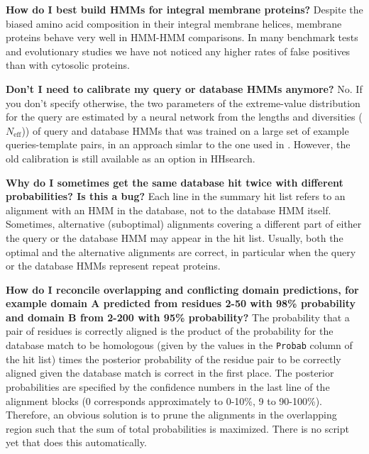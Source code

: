 \documentclass[11pt,a4paper]{article}
\begin{document}
{\bf How do I best build HMMs for integral membrane proteins?}
Despite the biased amino acid composition in their integral membrane helices, membrane proteins behave very well in HMM-HMM comparisons. In many benchmark tests and evolutionary studies we have not noticed any higher rates of false positives than with cytosolic proteins. 

{\bf Don't I need to calibrate my query or database HMMs anymore?}
No. If you don't specify otherwise, the two parameters of the extreme-value distribution for the query are estimated by a neural network from the lengths and diversities ($N_\mathrm{eff}$)) of query and database HMMs that was trained on a large set of example queries-template pairs, in an approach simlar to the one used in \cite{Sadreyev:2008}. However, the old calibration is still available as an option in HHsearch.

{\bf Why do I sometimes get the same database hit twice with different probabilities? Is this a bug?} Each line in the summary hit list refers to an alignment with an HMM in the database, not to the database HMM itself. Sometimes, alternative (suboptimal) alignments covering a different part of either the query or the database HMM may appear in the hit list. Usually, both the optimal and the alternative alignments are correct, in particular when the query or the database HMMs represent repeat proteins. 

{\bf How do I reconcile overlapping and conflicting domain predictions, for example domain A predicted from residues 2-50 with 98\% probability and domain B from 2-200 with 95\% probability?} The probability that a pair of residues is correctly aligned is the product of the probability for the database match to be homologous (given by the values in the \verb`Probab` column of the hit list) times the posterior probability of the residue pair to be correctly aligned given the database match is correct in the first place. The posterior probabilities are specified by the confidence numbers in the last line of the alignment blocks (0 corresponds approximately to 0-10\%, 9 to 90-100\%). Therefore, an obvious solution is to prune the alignments in the overlapping region such that the sum of total probabilities is maximized. There is no script yet that does this automatically.
\end{document}
